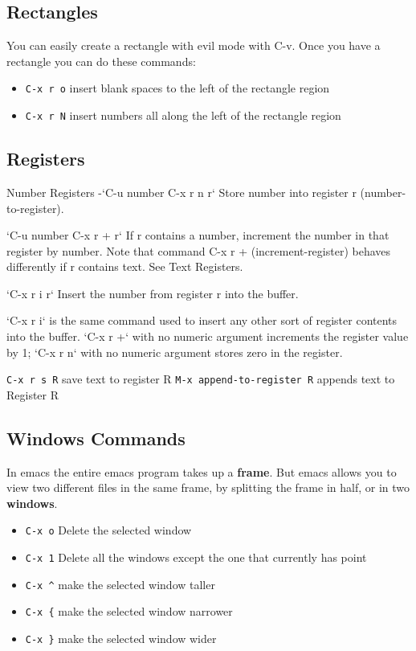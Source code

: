 \documentclass[11pt]{article}
\begin{document}
\subsection{Rectangles}
\label{sec:orgheadline9}
You can easily create a rectangle with evil mode with C-v.  Once you have a rectangle you can do these commands:

\begin{itemize}
\item \texttt{C-x r o} insert blank spaces to the left of the rectangle region
\item \texttt{C-x r N} insert numbers all along the left of the rectangle region
\end{itemize}
\subsection{Registers}
\label{sec:orgheadline10}
Number Registers
-`C-u number C-x r n r`
Store number into register r (number-to-register).

`C-u number C-x r + r`
If r contains a number, increment the number in that register by number. Note that command C-x r + (increment-register) behaves differently if r contains text. See Text Registers.

`C-x r i r`
Insert the number from register r into the buffer.

`C-x r i` is the same command used to insert any other sort of register contents into the buffer. `C-x r +` with no numeric argument increments the register value by 1; `C-x r n` with no numeric argument stores zero in the register.

\texttt{C-x r s R}  save text to register R
\texttt{M-x append-to-register R} appends text to Register R
\subsection{Windows Commands}
\label{sec:orgheadline11}
In emacs the entire emacs program takes up a \textbf{frame}.  But emacs allows you to view two different files in the same frame, by splitting the frame in half, or in two \textbf{windows}.
\begin{itemize}
\item \texttt{C-x o} Delete the selected window
\item \texttt{C-x 1} Delete all the windows except the one that currently has point
\item \texttt{C-x \textasciicircum{}} make the selected window taller
\item \texttt{C-x \{} make the selected window narrower
\item \texttt{C-x \}} make the selected window wider
\end{itemize}
\end{document}
